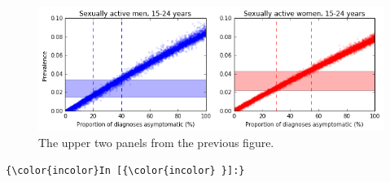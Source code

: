 \documentclass{article}
\begin{document}
    \begin{figure}
        \begin{center}\includegraphics[width=15cm]{england_files/england_34_1.png}\end{center}
        \caption{The upper two panels from the previous figure.}
        \label{fig:prev_samples_byage}
    \end{figure}
    
    \begin{footnotesize}
        \begin{Verbatim}[commandchars=\\\{\}]
{\color{incolor}In [{\color{incolor} }]:} 
\end{Verbatim}
    \end{footnotesize}


    
    
    
    
\end{document}
